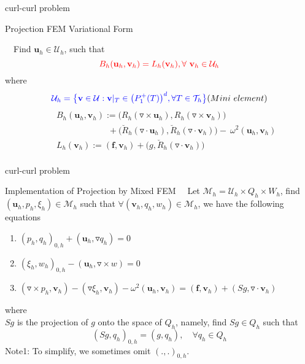 \documentclass[13pt]{beamer}
\begin{document}
\begin{frame}[t]{curl-curl problem}
   \begin{block}{Projection FEM Variational Form}

     $\quad$Find $\mathbf{u}_h\in\mathcal{U}_h$, such that
     \begin{equation}{\color{red}B_h(\mathbf{u}_h,\mathbf{v}_h) = L_h(\mathbf{v}_h), \forall\ \mathbf{v}_h\in\mathcal{U}_h}\end{equation}
     where
     \[{\color{blue}\mathcal{U}_h = \big\{\mathbf{v}\in \mathcal{U}: \mathbf{v}|_T\in\big(P_{1}^{+}(T)\big)^d, \forall T\in \mathcal{T}_h\big\}} (Mini\ element)\]
     \begin{eqnarray}
         \nonumber
         &&B_h(\mathbf{u}_h,\mathbf{v}_h) := \big(R_h(\triangledown\times\mathbf{u}_h),R_h(\triangledown\times\mathbf{v}_h)\big) \\ \nonumber
         &&\qquad\qquad\qquad + \big(\breve{R}_h(\triangledown\cdot\mathbf{u}_h),\breve{R}_h(\triangledown\cdot\mathbf{v}_h)\big) - \
         \omega^2(\mathbf{u}_h,\mathbf{v}_h)  \\ \nonumber
         &&L_h(\mathbf{v}_h) := (\mathbf{f},\mathbf{v}_h) + \big(g,\breve{R}_h(\triangledown\cdot\mathbf{v}_h)\big) \\ \nonumber
     \end{eqnarray}
   \end{block}

\end{frame}

\begin{frame}[t]{curl-curl problem}
  \begin{block}{Implementation of Projection by Mixed FEM}
    $\quad$Let $\mathcal{M}_h = \mathcal{U}_h\times Q_h\times W_h$, find $(\mathbf{u}_h,p_h,\xi_h)\in\mathcal{M}_h$ such that $\forall(\mathbf{v}_h,q_h,w_h)\in\mathcal{M}_h$, we have the following equations
    \qquad\begin{enumerate}
      \item $(p_h,q_h)_{0,h} + (\mathbf{u}_h,\triangledown q_h) = 0$
      \item $(\xi_h,w_h)_{0,h} - (\mathbf{u}_h,\triangledown\times w) = 0$
      \item $(\triangledown\times p_h,\mathbf{v}_h) - (\triangledown \xi_h,\mathbf{v}_h) -\omega^2(\mathbf{u}_h,\mathbf{v}_h) = ( \mathbf{f},\mathbf{v}_h) + (Sg,\triangledown\cdot\mathbf{v}_h) $
    \end{enumerate}
  where \\
  \qquad$Sg$ is the projection of $g$ onto the space of $Q_h$, namely, find $Sg\in Q_h$ such that \\[-2ex]
  \[(Sg,q_h)_{0,h} = (g,q_h),\quad \forall q_h\in Q_h\]
  Note1: To simplify, we sometimes omit $(.,.)_{0,h}.$
  \end{block}
\end{frame}
\end{document}
